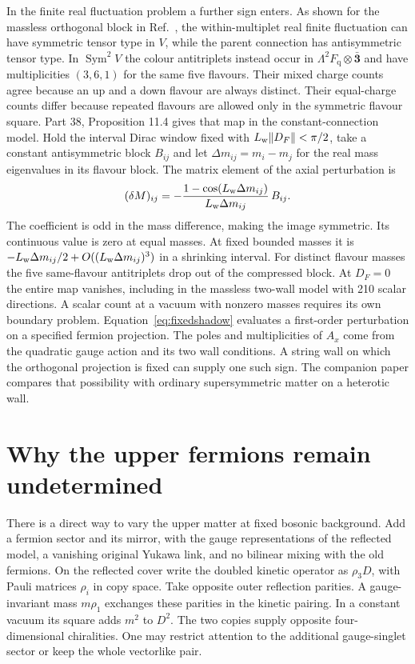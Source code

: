 \documentclass[aps,prd,reprint,onecolumn,nofootinbib,amsmath,amssymb]{revtex4-2}
\begin{document}
In the finite real fluctuation problem a further sign enters. As shown for the massless orthogonal block in Ref.~\cite{realnote}, the within-multiplet real finite fluctuation can have symmetric tensor type in $V$, while the parent connection has antisymmetric tensor type. In $\operatorname{Sym}^2 V$ the colour antitriplets instead occur in $\Lambda^2F_{\mathrm q}\otimes\bar{\mathbf3}$ and have multiplicities $(3,6,1)$ for the same five flavours. Their mixed charge counts agree because an up and a down flavour are always distinct. Their equal-charge counts differ because repeated flavours are allowed only in the symmetric flavour square. Part 38, Proposition 11.4 gives that map in the constant-connection model. Hold the interval Dirac window fixed with $L_{\rm w}\|D_F\|<\pi/2$, take a constant antisymmetric block $B_{ij}$ and let $\Delta m_{ij}=m_i-m_j$ for the real mass eigenvalues in its flavour block. The matrix element of the axial perturbation is
\begin{equation}
 (\delta M)_{ij}=
 -\frac{1-\cos(L_{\rm w}\Delta m_{ij})}
        {L_{\rm w}\Delta m_{ij}}\,B_{ij}.
 \label{eq:fixedshadow}
\end{equation}
The coefficient is odd in the mass difference, making the image symmetric. Its continuous value is zero at equal masses. At fixed bounded masses it is $-L_{\rm w}\Delta m_{ij}/2+O((L_{\rm w}\Delta m_{ij})^3)$ in a shrinking interval. For distinct flavour masses the five same-flavour antitriplets drop out of the compressed block. At $D_F=0$ the entire map vanishes, including in the massless two-wall model with 210 scalar directions. A scalar count at a vacuum with nonzero masses requires its own boundary problem. Equation~\eqref{eq:fixedshadow} evaluates a first-order perturbation on a specified fermion projection. The poles and multiplicities of $A_x$ come from the quadratic gauge action and its two wall conditions. A string wall on which the orthogonal projection is fixed can supply one such sign. The companion paper compares that possibility with ordinary supersymmetric matter on a heterotic wall.

\section{Why the upper fermions remain undetermined}
There is a direct way to vary the upper matter at fixed bosonic background. Add a fermion sector and its mirror, with the gauge representations of the reflected model, a vanishing original Yukawa link, and no bilinear mixing with the old fermions. On the reflected cover write the doubled kinetic operator as $\rho_3 D$, with Pauli matrices $\rho_i$ in copy space. Take opposite outer reflection parities. A gauge-invariant mass $m\rho_1$ exchanges these parities in the kinetic pairing. In a constant vacuum its square adds $m^2$ to $D^2$. The two copies supply opposite four-dimensional chiralities. One may restrict attention to the additional gauge-singlet sector or keep the whole vectorlike pair.
\end{document}

